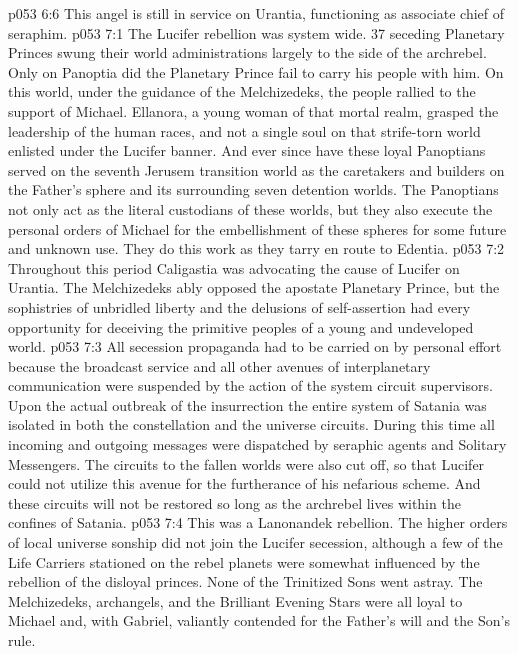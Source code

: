 \vs p053 6:6 \pc This angel is still in service on Urantia, functioning as associate chief of seraphim.
\vs p053 7:1 The Lucifer rebellion was system wide. 37 seceding Planetary Princes swung their world administrations largely to the side of the archrebel. Only on Panoptia did the Planetary Prince fail to carry his people with him. On this world, under the guidance of the Melchizedeks, the people rallied to the support of Michael. Ellanora, a young woman of that mortal realm, grasped the leadership of the human races, and not a single soul on that strife\hyp{}torn world enlisted under the Lucifer banner. And ever since have these loyal Panoptians served on the seventh Jerusem transition world as the caretakers and builders on the Father’s sphere and its surrounding seven detention worlds. The Panoptians not only act as the literal custodians of these worlds, but they also execute the personal orders of Michael for the embellishment of these spheres for some future and unknown use. They do this work as they tarry en route to Edentia.
\vs p053 7:2 Throughout this period Caligastia was advocating the cause of Lucifer on Urantia. The Melchizedeks ably opposed the apostate Planetary Prince, but the sophistries of unbridled liberty and the delusions of self\hyp{}assertion had every opportunity for deceiving the primitive peoples of a young and undeveloped world.
\vs p053 7:3 All secession propaganda had to be carried on by personal effort because the broadcast service and all other avenues of interplanetary communication were suspended by the action of the system circuit supervisors. Upon the actual outbreak of the insurrection the entire system of Satania was isolated in both the constellation and the universe circuits. During this time all incoming and outgoing messages were dispatched by seraphic agents and Solitary Messengers. The circuits to the fallen worlds were also cut off, so that Lucifer could not utilize this avenue for the furtherance of his nefarious scheme. And these circuits will not be restored so long as the archrebel lives within the confines of Satania.
\vs p053 7:4 This was a Lanonandek rebellion. The higher orders of local universe sonship did not join the Lucifer secession, although a few of the Life Carriers stationed on the rebel planets were somewhat influenced by the rebellion of the disloyal princes. None of the Trinitized Sons went astray. The Melchizedeks, archangels, and the Brilliant Evening Stars were all loyal to Michael and, with Gabriel, valiantly contended for the Father’s will and the Son’s rule.
